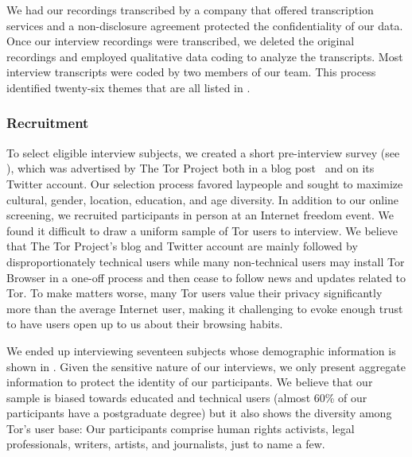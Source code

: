 We had our recordings transcribed by a company that offered transcription
services and a non-disclosure agreement protected the confidentiality of our
data.  Once our interview recordings were transcribed, we deleted the original
recordings and employed qualitative data coding to analyze the transcripts.
Most interview transcripts were coded by two members of our team.  This process
identified twenty-six themes that are all listed in .

\subsubsection{Recruitment}

To select eligible interview subjects, we created a short pre-interview survey
(see ), which was advertised by The Tor Project both
in a blog post~\cite{Winter2017a} and on its Twitter account.  Our selection
process favored laypeople and sought to maximize cultural, gender, location,
education, and age diversity.  In addition to our online screening, we recruited
participants in person at an Internet freedom event.  We found it difficult to
draw a uniform sample of Tor users to interview. We believe that The Tor
Project's blog and Twitter account are mainly followed by disproportionately
technical users while many non-technical users may install Tor Browser in a
one-off process and then cease to follow news and updates related to Tor.  To
make matters worse, many Tor users value their privacy significantly more than
the average Internet user, making it challenging to evoke enough trust to have
users open up to us about their browsing habits.

We ended up interviewing seventeen subjects whose demographic information is
shown in .  Given the sensitive nature of our
interviews, we only present aggregate information to protect the identity of our
participants.  We believe that our sample is biased towards educated and
technical users (almost 60\% of our participants have a postgraduate degree) but
it also shows the diversity among Tor's user base: Our participants comprise
human rights activists, legal professionals, writers, artists, and journalists,
just to name a few.

